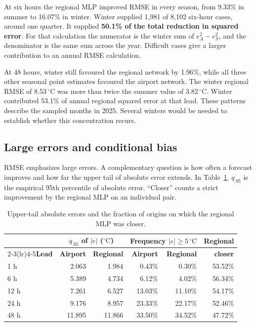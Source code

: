 \documentclass[11pt,letterpaper]{article}
\newcommand{\thead}[1]{\textbf{#1}}\newcommand{\bestscore}[1]{\textbf{#1}}
\newcommand{\celsius}{\ensuremath{^{\circ}\mathrm{C}}}\newcommand{\code}[1]{\texttt{\small #1}}
\begin{document}
At six hours the regional MLP improved RMSE in every season, from 9.33\% in summer to 16.07\% in winter. Winter supplied 1,981 of 8,102 six-hour cases, around one quarter. It supplied \textbf{50.1\% of the total reduction in squared error}. For that calculation the numerator is the winter sum of $e_A^2-e_S^2$, and the denominator is the same sum across the year. Difficult cases give a larger contribution to an annual RMSE calculation.

At 48 hours, winter still favoured the regional network by 1.96\%, while all three other seasonal point estimates favoured the airport network. The winter regional RMSE of 8.53\,\celsius{} was more than twice the summer value of 3.82\,\celsius. Winter contributed 53.1\% of annual regional squared error at that lead. These patterns describe the sampled months in 2025. Several winters would be needed to establish whether this concentration recurs.


\subsection{Large errors and conditional bias}\label{tails}
RMSE emphasizes large errors. A complementary question is how often a forecast improves and how far the upper tail of absolute error extends. In Table~\ref{tab:tails}, $q_{.95}$ is the empirical 95th percentile of absolute error. ``Closer'' counts a strict improvement by the regional MLP on an individual pair.



\begin{table}[!htbp]
\centering\small
\caption{Upper-tail absolute errors and the fraction of origins on which the regional MLP was closer.}\label{tab:tails}
\renewcommand{\arraystretch}{1.13}\begin{tabular*}{.98\linewidth}{@{\extracolsep{\fill}}lrrrrr@{}}\toprule
 & \multicolumn{2}{c}{\thead{$q_{.95}$ of $|e|$ (\celsius)}} & \multicolumn{2}{c}{\thead{Frequency $|e|\ge5\,\celsius$}} & \thead{Regional}\\
\cmidrule(lr){2-3}\cmidrule(lr){4-5}\thead{Lead}&\thead{Airport}&\thead{Regional}&\thead{Airport}&\thead{Regional}&\thead{closer}\\\midrule
1 h & 2.063 & 1.984 & 0.43\% & 0.30\% & 53.52\% \\
6 h & 5.389 & 4.734 & 6.12\% & 4.02\% & 56.34\% \\
12 h & 7.261 & 6.527 & 13.03\% & 11.10\% & 54.17\% \\
24 h & 9.176 & 8.957 & 23.33\% & 22.17\% & 52.46\% \\
48 h & 11.895 & 11.866 & 33.50\% & 34.52\% & 47.72\% \\
\bottomrule\end{tabular*}
\end{table}
\end{document}
